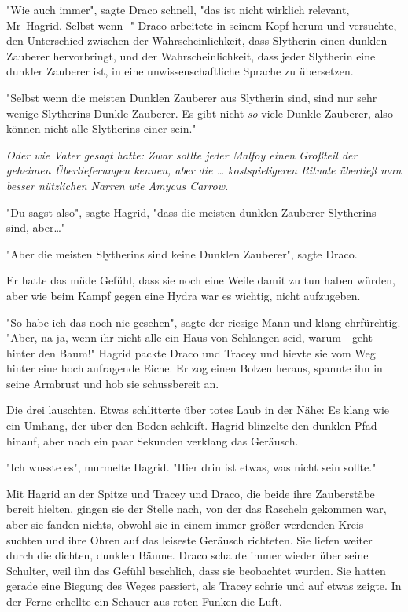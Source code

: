 {"Wie auch immer", sagte Draco schnell, "das ist nicht wirklich relevant, Mr~Hagrid. Selbst wenn -" Draco arbeitete in seinem Kopf herum und versuchte, den Unterschied zwischen der Wahrscheinlichkeit, dass Slytherin einen dunklen Zauberer hervorbringt, und der Wahrscheinlichkeit, dass jeder Slytherin eine dunkler Zauberer ist, in eine unwissenschaftliche Sprache zu übersetzen.

"Selbst wenn die meisten Dunklen Zauberer aus Slytherin sind, sind nur sehr wenige Slytherins Dunkle Zauberer. Es gibt nicht \emph{so} viele Dunkle Zauberer, also können nicht alle Slytherins einer sein."

\emph{Oder wie Vater gesagt hatte: Zwar sollte jeder Malfoy einen Großteil der geheimen Überlieferungen kennen, aber die … kostspieligeren Rituale überließ man besser nützlichen Narren wie Amycus Carrow.}

"Du sagst also", sagte Hagrid, "dass die meisten dunklen Zauberer Slytherins sind, aber…"

"Aber die meisten Slytherins sind keine Dunklen Zauberer", sagte Draco.

Er hatte das müde Gefühl, dass sie noch eine Weile damit zu tun haben würden, aber wie beim Kampf gegen eine Hydra war es wichtig, nicht aufzugeben.

"So habe ich das noch nie gesehen", sagte der riesige Mann und klang ehrfürchtig. "Aber, na ja, wenn ihr nicht alle ein Haus von Schlangen seid, warum - geht hinter den Baum!" Hagrid packte Draco und Tracey und hievte sie vom Weg hinter eine hoch aufragende Eiche. Er zog einen Bolzen heraus, spannte ihn in seine Armbrust und hob sie schussbereit an.

Die drei lauschten. Etwas schlitterte über totes Laub in der Nähe: Es klang wie ein Umhang, der über den Boden schleift. Hagrid blinzelte den dunklen Pfad hinauf, aber nach ein paar Sekunden verklang das Geräusch.

"Ich wusste es", murmelte Hagrid. "Hier drin ist etwas, was nicht sein sollte."

Mit Hagrid an der Spitze und Tracey und Draco, die beide ihre Zauberstäbe bereit hielten, gingen sie der Stelle nach, von der das Rascheln gekommen war, aber sie fanden nichts, obwohl sie in einem immer größer werdenden Kreis suchten und ihre Ohren auf das leiseste Geräusch richteten. Sie liefen weiter durch die dichten, dunklen Bäume. Draco schaute immer wieder über seine Schulter, weil ihn das Gefühl beschlich, dass sie beobachtet wurden. Sie hatten gerade eine Biegung des Weges passiert, als Tracey schrie und auf etwas zeigte. In der Ferne erhellte ein Schauer aus roten Funken die Luft.

}
